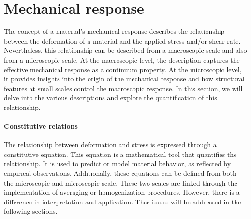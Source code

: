 \section{Mechanical response}

The concept of a material's mechanical response describes the relationship between the deformation of a material and the applied stress and/or shear rate.
Nevertheless, this relationship can be described from a macroscopic scale and also from a microscopic scale.
At the macroscopic level, the description captures the effective mechanical response as a continuum property. 
At the microscopic level, it provides insights into the origin of the mechanical response and how structural features at small scales control the macroscopic response.
In this section, we will delve into the various descriptions and explore the quantification of this relationship.

\paragraph{Constitutive relations} The relationship between deformation and stress is expressed through a constitutive equation.
This equation is a mathematical tool that quantifies the relationship. 
It is used to predict or model material behavior, as reflected by empirical observations.
Additionally, these equations can be defined from both the microscopic and microscopic scale.
These two scales are linked through the implementation of averaging or homogenization procedures.
However, there is a difference in interpretation and application.
Thse issues will be addressed in the following sections.

